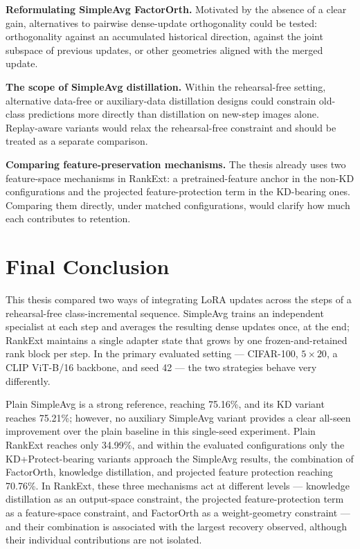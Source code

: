 \textbf{Reformulating SimpleAvg FactorOrth.} Motivated by the absence of a
clear gain, alternatives to pairwise dense-update orthogonality could be
tested: orthogonality against an accumulated historical direction, against
the joint subspace of previous updates, or other geometries aligned with
the merged update.

\textbf{The scope of SimpleAvg distillation.} Within the rehearsal-free
setting, alternative data-free or auxiliary-data distillation designs could
constrain old-class predictions more directly than distillation on
new-step images alone. Replay-aware variants would relax the rehearsal-free
constraint and should be treated as a separate comparison.

\textbf{Comparing feature-preservation mechanisms.} The thesis already uses
two feature-space mechanisms in RankExt: a pretrained-feature anchor in the
non-KD configurations and the projected feature-protection term in the
KD-bearing ones. Comparing them directly, under matched configurations,
would clarify how much each contributes to retention.

\section{Final Conclusion}
\label{sec:ch6-conclusion}

This thesis compared two ways of integrating LoRA updates across the steps
of a rehearsal-free class-incremental sequence. SimpleAvg trains an
independent specialist at each step and averages the resulting dense
updates once, at the end; RankExt maintains a single adapter state that
grows by one frozen-and-retained rank block per step. In the primary
evaluated setting --- CIFAR-100, $5\times20$, a CLIP ViT-B/16 backbone, and
seed 42 --- the two strategies behave very differently.

Plain SimpleAvg is a strong reference, reaching 75.16\%, and its KD variant
reaches 75.21\%; however, no auxiliary SimpleAvg variant provides a clear
all-seen improvement over the plain baseline in this single-seed
experiment. Plain RankExt reaches only 34.99\%, and within the evaluated
configurations only the KD+Protect-bearing variants approach the SimpleAvg
results, the combination of FactorOrth, knowledge distillation, and
projected feature protection reaching 70.76\%. In RankExt, these three
mechanisms act at different levels --- knowledge distillation as an
output-space constraint, the projected feature-protection term as a
feature-space constraint, and FactorOrth as a weight-geometry constraint
--- and their combination is associated with the largest recovery
observed, although their individual contributions are not isolated.

